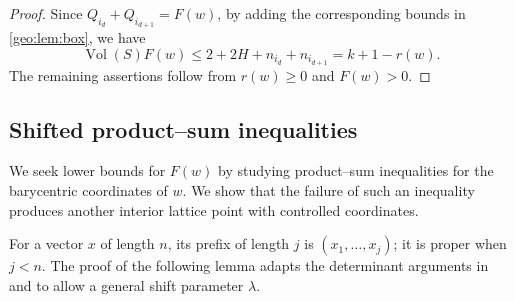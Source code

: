 \documentclass[reqno, 11pt]{article}
\numberwithin{equation}{section}
\theoremstyle{definition}
\begin{document}
\begin{proof}
Since $Q_{i_d}+Q_{i_{d+1}}=F(w)$, by adding the corresponding bounds in \cref{geo:lem:box}, we have 
\[
 \operatorname{Vol}(S)F(w)
 \le2+2H+n_{i_d}+n_{i_{d+1}}=k+1-r(w).
\]
The remaining assertions follow from $r(w)\ge0$ and $F(w)>0$.
\end{proof}




\subsection{Shifted product--sum inequalities}
We seek lower bounds for $F(w)$ by studying product--sum inequalities
for the barycentric coordinates of $w$.
We show that the failure of such an inequality produces another
interior lattice point with controlled coordinates.

For a vector $x$ of length $n$, its
prefix of length $j$ is $(x_1,\ldots,x_j)$; it is proper when $j<n$. The proof of the following lemma adapts the determinant arguments in
\cite[proof of Theorem~1.1]{Ave12} and \cite[proof of Theorem~2.2]{AKN2020} 
to allow a general shift parameter $\lambda$.
\end{document}
